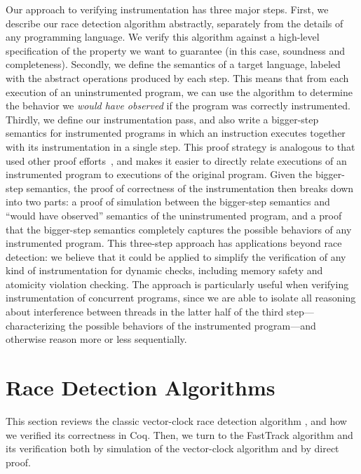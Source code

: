 \documentclass[preprint, 10pt]{sigplanconf}
\begin{document}
Our approach to verifying instrumentation has three major steps. First, we describe our race detection algorithm abstractly, separately from the details of any programming language. We verify this algorithm against a high-level specification of the property we want to guarantee (in this case, soundness and completeness). Secondly, we define the semantics of a target language, labeled with the abstract operations produced by each step. This means that from each execution of an uninstrumented program, we can use the algorithm to determine the behavior we \emph{would have observed} if the program was correctly instrumented. Thirdly, we define our instrumentation pass, and also write a bigger-step semantics for instrumented programs in which an instruction executes together with its instrumentation in a single step. This proof strategy is analogous to that used other proof efforts~\cite{softbound}, and makes it easier to directly relate executions of an instrumented program to executions of the original program. Given the bigger-step semantics, the proof of correctness of the instrumentation then breaks down into two parts: a proof of simulation between the bigger-step semantics and ``would have observed'' semantics of the uninstrumented program, and a proof that the bigger-step semantics completely captures the possible behaviors of any instrumented program. This three-step approach has applications beyond race detection: we believe that it could be applied to simplify the verification of any kind of instrumentation for dynamic checks, including memory safety and atomicity violation checking. The approach is particularly useful when verifying instrumentation of concurrent programs, since we are able to isolate all reasoning about interference between threads in the latter half of the third step---characterizing the possible behaviors of the instrumented program---and otherwise reason more or less sequentially.

\section{Race Detection Algorithms}
\label{algorithms}

This section reviews the classic vector-clock race detection algorithm \cite{}, and how we verified its correctness in Coq. Then, we turn to the FastTrack \cite{fasttrack} algorithm and its verification both by simulation of the vector-clock algorithm and by direct proof.

\end{document}
